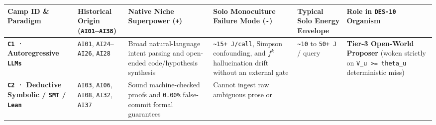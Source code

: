 \documentclass[10pt,letterpaper]{article}
\begin{document}
{\scriptsize\setlength{\tabcolsep}{3.0pt}\renewcommand{\arraystretch}{1.14}
\begin{longtable}[]{@{}
  >{\raggedright\arraybackslash}p{}
  >{\raggedright\arraybackslash}p{}
  >{\raggedright\arraybackslash}p{}
  >{\raggedright\arraybackslash}p{}
  >{\raggedright\arraybackslash}p{}
  >{\raggedright\arraybackslash}p{}@{}}
\toprule\noalign{}
\begin{minipage}[b]{\linewidth}\raggedright
\textbf{Camp ID \& Paradigm}
\end{minipage} & \begin{minipage}[b]{\linewidth}\raggedright
\textbf{Historical Origin (\texttt{AI01}--\texttt{AI38})}
\end{minipage} & \begin{minipage}[b]{\linewidth}\raggedright
\textbf{Native Niche Superpower (\texttt{+})}
\end{minipage} & \begin{minipage}[b]{\linewidth}\raggedright
\textbf{Solo Monoculture Failure Mode (\texttt{-})}
\end{minipage} & \begin{minipage}[b]{\linewidth}\raggedright
\textbf{Typical Solo Energy Envelope}
\end{minipage} & \begin{minipage}[b]{\linewidth}\raggedright
\textbf{Role in \texttt{DES-10} Organism}
\end{minipage} \\
\midrule\noalign{}
\endhead
\bottomrule\noalign{}
\endlastfoot
\textbf{\texttt{C1} · Autoregressive \texttt{LLMs}} & \texttt{AI01},
\texttt{AI24}--\texttt{AI26}, \texttt{AI28} & Broad natural-language
intent parsing and open-ended code/hypothesis synthesis &
\texttt{\textasciitilde{}15+\ J/call}, Simpson confounding, and \(f^k\)
hallucination drift without an external gate &
\texttt{\textasciitilde{}10} to \texttt{50+\ J} / query & \textbf{Tier-3
Open-World Proposer} (woken strictly on
\texttt{V\_u\ \textgreater{}=\ theta\_u} deterministic miss) \\
\textbf{\texttt{C2} · Deductive Symbolic / \texttt{SMT} / \texttt{Lean}}
& \texttt{AI03}, \texttt{AI06}, \texttt{AI08}, \texttt{AI32},
\texttt{AI37} & Sound machine-checked proofs and \texttt{0.00\%}
false-commit formal guarantees & Cannot ingest raw ambiguous prose or

\end{longtable}}
\end{document}
